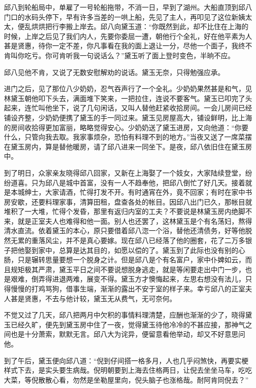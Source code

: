 \documentclass[12pt,UTF8]{ctexbook}
\begin{document}
{{{邱八到轮船局中，单雇了一号轮船拖带，不消一日，早到了湖州。大船直顶到邱八门口的水码头停下，早有许多当差的一哄上船，先见了主人，再叩见了这位新姨太太，便乱烘烘把行李搬上岸去。邱八向黛玉道：“你既然到此，却不比住在上海的时候，上岸之后见了我们内人，先要你委屈一遭，朝他行个全礼，好在他平素为人甚是贤惠，待你一定不差，你凡事看在我的面上退让一分，尽他一个面子，我终不肯叫你吃亏。你可肯听我一句说话么？”黛玉听了面上登时变色，半晌不应。

邱八见他不肯，又说了无数安慰解劝的说话。黛玉无奈，只得勉强应承。

进门之后，见了那位八少奶奶，忍气吞声行了一个全礼。少奶奶果然甚是和气，见林黛玉朝他叩下头去，满面堆下笑来，一把拉住，连说不要客气。黛玉已叩完了头起来，连忙叫他坐下，说了几句闲话，又叫人替他赶紧收拾房间。一会儿房间已经铺设齐整，少奶奶便携了黛玉的手一同过来。黛玉见房屋高大，铺设鲜明，比上海的房间收拾得更加富丽，略略觉得安心。少奶奶送了黛玉进房，又向他道：“你要什么，只管向我去取。我家事烦杂，恐怕有料理不到的地方。”当夜又送了一席菜摆在黛玉房内，算是替他暖房，请了邱八进来一同坐下。是夜，邱八依旧住在黛玉房中。

到了明日，众家亲友晓得邱八回家，又新在上海娶了一个妓女，大家陆续登堂，纷纷道喜。只为邱八是城中首富，没有一人不趋奉他，把邱八倒忙了好几天。接着就是本城绅士，大家请酒，忙得打发不开。有时通宵在外，竟不回家；有时在家中书房安歇，还要料理家事，清算田租，盘查各处的帐目。因邱八出门已久，那帐目就堆积了一大堆，忙得个发昏，那里有返归内室的工夫？不要说是林黛玉房内绝脚不来，就是正室夫人也难得和他一面。别人也还罢了，这林黛玉是个有名荡妇，熬得清水直流。依着黛玉的本心，原只要借着邱八淴一个浴，替他还清债务，好等他脱然无累的重落风尘，并不是真心要嫁。现在邱八已经落了他的圈套，花了二万多银子把他娶到家中，总算是达其目的，如愿以偿的了。黛玉到了此际也没有别的心肠，只是辗转思量要想一个脱身之计。但是邱八是个有名富户，家中仆婢如云，而且规矩极其严肃，黛玉平日之间不要说想脱身逃走，就是等闲要走出中门一步，也是艰难，倒弄得进退两难，展变不得。黛玉方才懊悔起来，左思右想没有法儿，只得慢慢的打鸡骂狗，借事生端，渐渐的露出不安于室的样子来。幸亏邱八的正室夫人甚是贤惠，不去与他计较，黛玉无从费气，无可奈何。

不觉又过了几天，邱八把两月中欠积的事情料理清楚，应酬也渐渐的少了，晓得黛玉已经久旷，便先到黛玉房中住了一夜，觉得黛玉待他冷冷的不甚应接，那神气之间也是十分萧索，默默无言。邱八大为诧异，便留意看他举动，却又不好意思问他。

到了午后，黛玉便向邱八道：“倪到仔间搭一格多月，人也几乎闷煞快，再要实梗样式下去，是实头要生病哉。倪明朝要到上海去住格两日，让倪去坐坐马车，吃吃大菜，等倪散散心看，勿然是坐勒屋里向，倪头脑子也涨格哉。耐阿肯同倪去？”

}}}
\end{document}
